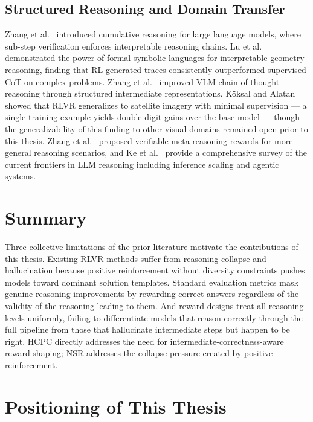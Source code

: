 \documentclass{iutbscthesis}
\begin{document}
\subsection{Structured Reasoning and Domain Transfer}

Zhang et al.\ \cite{zhang2024cumulative} introduced cumulative reasoning for large language models, where sub-step verification enforces interpretable reasoning chains. Lu et al.\ \cite{lu2021intergps} demonstrated the power of formal symbolic languages for interpretable geometry reasoning, finding that RL-generated traces consistently outperformed supervised CoT on complex problems. Zhang et al.\ \cite{zhang2025improvevlm} improved VLM chain-of-thought reasoning through structured intermediate representations. K\"{o}ksal and Alatan \cite{koksal2025fewshot} showed that RLVR generalizes to satellite imagery with minimal supervision --- a single training example yields double-digit gains over the base model --- though the generalizability of this finding to other visual domains remained open prior to this thesis. Zhang et al.\ \cite{zhang2025rlvmr} proposed verifiable meta-reasoning rewards for more general reasoning scenarios, and Ke et al.\ \cite{ke2025survey} provide a comprehensive survey of the current frontiers in LLM reasoning including inference scaling and agentic systems.

\section{Summary}

Three collective limitations of the prior literature motivate the contributions of this thesis. Existing RLVR methods suffer from reasoning collapse and hallucination because positive reinforcement without diversity constraints pushes models toward dominant solution templates. Standard evaluation metrics mask genuine reasoning improvements by rewarding correct answers regardless of the validity of the reasoning leading to them. And reward designs treat all reasoning levels uniformly, failing to differentiate models that reason correctly through the full pipeline from those that hallucinate intermediate steps but happen to be right. HCPC directly addresses the need for intermediate-correctness-aware reward shaping; NSR addresses the collapse pressure created by positive reinforcement.

\section{Positioning of This Thesis}
\end{document}
